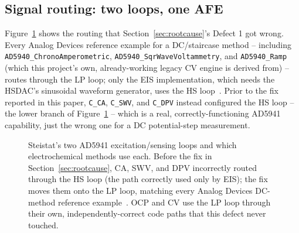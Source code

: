 \subsection{Signal routing: two loops, one AFE}
\label{sec:loop-diagram}
Figure~\ref{fig:loop-diagram} shows the routing that
Section~\ref{sec:rootcause}'s Defect 1 got wrong. Every Analog
Devices reference example for a DC/staircase method -- including
\texttt{AD5940\_ChronoAmperometric}, \texttt{AD5940\_SqrWaveVoltammetry},
and \texttt{AD5940\_Ramp} (which this project's own, already-working
legacy CV engine is derived from) -- routes through the LP loop; only the
EIS implementation, which needs the HSDAC's sinusoidal waveform generator,
uses the HS loop~\cite{ad5940_examples_github}. Prior to the fix reported
in this paper, \texttt{C\_CA}, \texttt{C\_SWV}, and \texttt{C\_DPV}
instead configured the HS loop -- the lower branch of
Figure~\ref{fig:loop-diagram} -- which is a real, correctly-functioning
AD5941 capability, just the wrong one for a DC potential-step measurement.

\begin{figure}[H]
\centering
{}
\caption{Steistat's two AD5941 excitation/sensing loops and which
electrochemical methods use each. Before the fix in
Section~\ref{sec:rootcause}, CA, SWV, and DPV incorrectly routed through
the HS loop (the path correctly used only by EIS); the fix moves them onto
the LP loop, matching every Analog Devices DC-method reference
example~\cite{ad5940_examples_github}. OCP and CV use the LP loop through
their own, independently-correct code paths that this defect never
touched.}
\label{fig:loop-diagram}
\end{figure}

